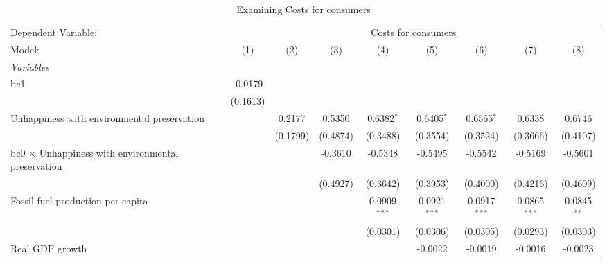 
\begin{table}[htbp]
   \caption{Examining Costs for consumers}
   \centering
   \begin{tabular}{lcccccccc}
      \tabularnewline \midrule \midrule
      Dependent Variable: & \multicolumn{8}{c}{Costs for consumers}\\
      Model:                                                    & (1)      & (2)      & (3)      & (4)            & (5)            & (6)            & (7)            & (8)\\  
      \midrule
      \emph{Variables}\\
      bc1                                                       & -0.0179  &          &          &                &                &                &                &   \\   
                                                                & (0.1613) &          &          &                &                &                &                &   \\   
      Unhappiness with environmental preservation               &          & 0.2177   & 0.5350   & 0.6382$^{*}$   & 0.6405$^{*}$   & 0.6565$^{*}$   & 0.6338         & 0.6746\\   
                                                                &          & (0.1799) & (0.4874) & (0.3488)       & (0.3554)       & (0.3524)       & (0.3666)       & (0.4107)\\   
      bc0 $\times$ Unhappiness with environmental preservation  &          &          & -0.3610  & -0.5348        & -0.5495        & -0.5542        & -0.5169        & -0.5601\\   
                                                                &          &          & (0.4927) & (0.3642)       & (0.3953)       & (0.4000)       & (0.4216)       & (0.4609)\\   
      Fossil fuel production per capita                         &          &          &          & 0.0909$^{***}$ & 0.0921$^{***}$ & 0.0917$^{***}$ & 0.0865$^{***}$ & 0.0845$^{**}$\\   
                                                                &          &          &          & (0.0301)       & (0.0306)       & (0.0305)       & (0.0293)       & (0.0303)\\   
      Real GDP growth                                           &          &          &          &                & -0.0022        & -0.0019        & -0.0016        & -0.0023\\   

\end{tabular}
\end{table}
